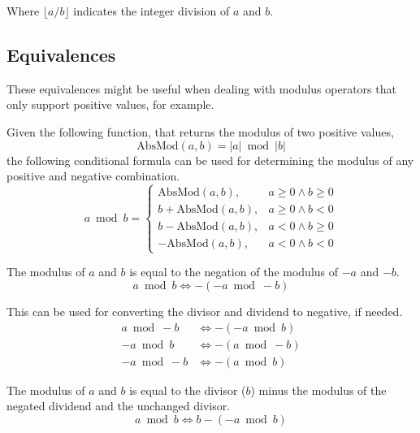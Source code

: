 \documentclass{article}
\begin{document}
Where $\lfloor a / b \rfloor$ indicates the integer division of $a$ and $b$.

\subsection{Equivalences}

These equivalences might be useful when dealing with modulus operators that only
support positive values, for example.

\medskip

Given the following function, that returns the modulus of two positive values,
\begin{equation*}
  \text{AbsMod}(a, b) = |a| \bmod |b|
\end{equation*}
the following conditional formula can be used for determining the modulus of any
positive and negative combination.
\begin{equation*}
  a \bmod b =
  \begin{cases}
    \text{AbsMod}(a, b),     & a \geq 0 \land b \geq 0 \\
    b + \text{AbsMod}(a, b), & a \geq 0 \land b < 0 \\
    b - \text{AbsMod}(a, b), & a < 0 \land b \geq 0 \\
    -\text{AbsMod}(a, b),    & a < 0 \land b < 0
  \end{cases}
\end{equation*}

The modulus of $a$ and $b$ is equal to the negation of the modulus of $-a$ and
$-b$.
\begin{equation*}
  a \bmod  b \iff - \left( -a \bmod -b \right)
\end{equation*}

This can be used for converting the divisor and dividend to negative, if needed.
\begin{align*}
  a  \bmod -b & \iff - \left( -a \bmod  b \right) \\
  -a \bmod  b & \iff - \left(  a \bmod -b \right) \\
  -a \bmod -b & \iff - \left(  a \bmod  b \right)
\end{align*}

The modulus of $a$ and $b$ is equal to the divisor ($b$) minus the modulus of
the negated dividend and the unchanged divisor.
\begin{equation*}
  a \bmod b \iff b - (-a \bmod b)
\end{equation*}
\end{document}
